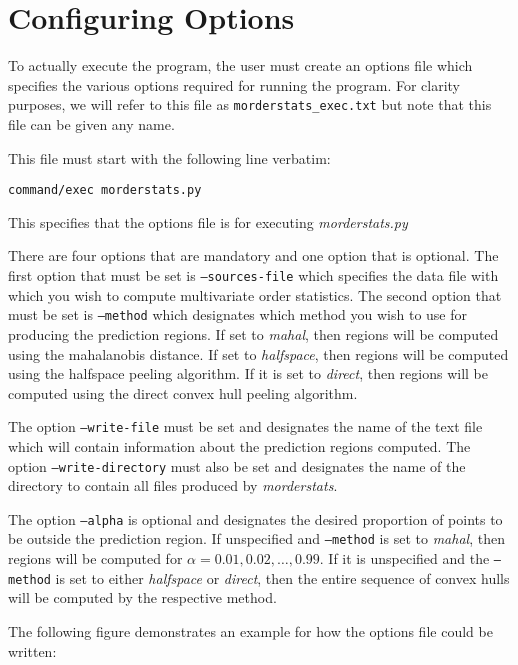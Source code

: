 \documentclass[11pt]{article}
\begin{document}
\section{Configuring Options}

To actually execute the program, the user must create an options file which specifies the various options required for running the program. For clarity purposes, we will refer to this file as \texttt{morderstats\_exec.txt} but note that this file can be given any name.

This file must start with the following line verbatim:
\begin{center}
	\texttt{command/exec morderstats.py}
\end{center}
This specifies that the options file is for executing \textit{morderstats.py}

There are four options that are mandatory and one option that is optional.
The first option that must be set is \texttt{--sources-file} which specifies the data file with which you wish to compute multivariate order statistics.
The second option that must be set is \texttt{--method} which designates which method you wish to use for producing the prediction regions.
If set to \textit{mahal}, then regions will be computed using the mahalanobis distance.
If set to \textit{halfspace}, then regions will be computed using the halfspace peeling algorithm.
If it is set to \textit{direct}, then regions will be computed using the direct convex hull peeling algorithm.

The option \texttt{--write-file} must be set and designates the name of the text file which will contain information about the prediction regions computed.
The option \texttt{--write-directory} must also be set and designates the name of the directory to contain all files produced by \textit{morderstats}.

The option \texttt{--alpha} is optional and designates the desired proportion of points to be outside the prediction region. If unspecified and \texttt{--method} is set to \textit{mahal}, then regions will be computed for $\alpha = 0.01,0.02,\ldots,0.99$. If it is unspecified and the \texttt{--method} is set to either \textit{halfspace} or \textit{direct}, then the entire sequence of convex hulls will be computed by the respective method.

The following figure demonstrates an example for how the options file could be written:

\begin{framed}
	
\end{framed}
\end{document}
